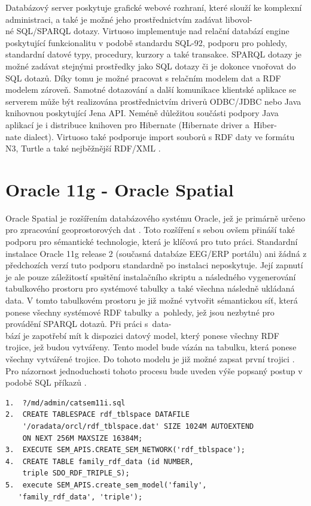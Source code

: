 \documentclass{projekt}
\begin{document}
Databázový server poskytuje grafické webové rozhraní, které slouží ke komplexní administraci, a také je možné jeho prostřednictvím zadávat libovol-\\né SQL/SPARQL dotazy. Virtuoso implementuje nad relační databází engine poskytující funkcionalitu v podobě standardu SQL-92, podporu pro pohledy, standardní datové typy, procedury, kurzory a také transakce. SPARQL dotazy je možné zadávat stejnými prostředky jako SQL dotazy či je dokonce vnořovat do SQL dotazů. Díky tomu je možné pracovat s relačním modelem dat a RDF modelem zároveň. Samotné dotazování a další komunikace klientské aplikace se serverem může být realizována prostřednictvím driverů ODBC/JDBC nebo Java knihovnou poskytující Jena API. Neméně důležitou součásti podpory Java aplikací je i distribuce knihoven pro Hibernate (Hibernate driver a~Hiber-\\nate dialect). Virtuoso také podporuje import souborů s RDF daty ve formátu N3, Turtle a také nejběžnější RDF/XML \cite{_24}.


\section{Oracle 11g - Oracle Spatial}
\hspace{0.65cm}Oracle Spatial je rozšířením databázového systému Oracle, jež je primárně určeno pro zpracování geoprostorových dat \cite{_25}. Toto rozšíření s sebou ovšem přináší také podporu pro sémantické technologie, která je klíčová pro tuto práci. Standardní instalace Oracle 11g release 2 (současná databáze EEG/ERP portálu) ani žádná z předchozích verzí tuto podporu standardně po instalaci neposkytuje. Její zapnutí je ale pouze záležitostí spuštění instalačního skriptu a následného vygenerování tabulkového prostoru pro systémové tabulky a také všechna následně ukládaná data. V tomto tabulkovém prostoru je již možné vytvořit sémantickou síť, která ponese všechny systémové RDF tabulky a~pohledy, jež jsou nezbytné pro provádění SPARQL dotazů. Při práci s~data-\\bází je zapotřebí mít k dispozici datový model, který ponese všechny RDF trojice, jež budou vytvářeny. Tento model bude vázán na tabulku, která ponese všechny vytvářené trojice. Do tohoto modelu je již možné zapsat první trojici \cite{_26}.
Pro názornost jednoduchosti tohoto procesu bude uveden výše popsaný postup v podobě SQL příkazů \cite{_26}. 

\begin{verbatim}
1.  ?/md/admin/catsem11i.sql
2.  CREATE TABLESPACE rdf_tblspace DATAFILE 
    '/oradata/orcl/rdf_tblspace.dat' SIZE 1024M AUTOEXTEND 
    ON NEXT 256M MAXSIZE 16384M;
3.  EXECUTE SEM_APIS.CREATE_SEM_NETWORK('rdf_tblspace');
4.  CREATE TABLE family_rdf_data (id NUMBER, 
    triple SDO_RDF_TRIPLE_S);
5.  execute SEM_APIS.create_sem_model('family', 
   'family_rdf_data', 'triple');
\end{verbatim}
\end{document}
